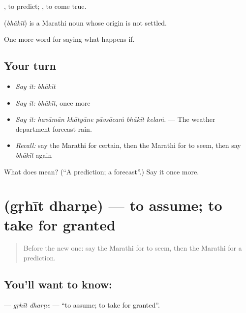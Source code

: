  , to predict;   , to come true.

\begin{cousinweb}
\textbf{} (\emph{bhākīt}) is a Marathi noun whose origin is not settled.
\end{cousinweb}

\begin{grammarlens}[title={What you've built}]
One more word for saying what happens if.
\end{grammarlens}

\subsection*{Your turn}
\begin{itemize}
\raggedright
  \item \emph{Say it:} \emph{bhākīt}
  \item \emph{Say it:} \emph{bhākīt}, once more
  \item \emph{Say it:} \emph{havāmān khātyāne pāvsācaṁ bhākīt kelaṁ.} — The weather department forecast rain.
  \item \emph{Recall:} say the Marathi for certain, then the Marathi for to seem, then say \emph{bhākīt} again
\end{itemize}

\begin{tcolorbox}[breakable,colback=teal!4,colframe=teal!35!black,title={Before you move on}]
What does  mean? (\textquotedblleft{}A prediction; a forecast\textquotedblright{}.) Say it once more.
\end{tcolorbox}
\section[\texorpdfstring{\mr{गृहीत} \mr{धरणे} (gṛhīt dharṇe)}{गृहीत धरणे (gṛhīt dharṇe)}]{  (gṛhīt dharṇe) — to assume; to take for granted}

\label{lesson:MR-C383-grhit-dharne}



\begin{quote}
Before the new one: say the Marathi for to seem, then the Marathi for a prediction.
\end{quote}

\subsection*{You'll want to know:  }
\textbf{ } — \emph{gṛhīt dharṇe} — \textquotedblleft{}to assume; to take for granted\textquotedblright{}.

